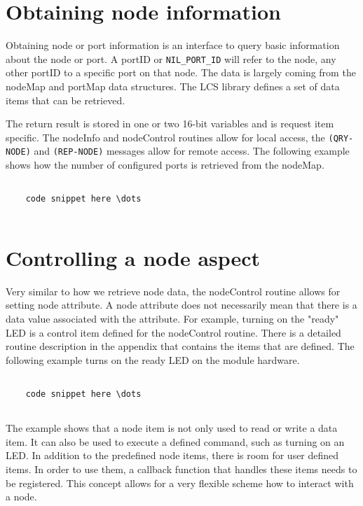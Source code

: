 \section{Obtaining node information}

Obtaining node or port information is an interface to query basic information about the node or port. A portID or \texttt{NIL\_PORT\_ID} will refer to the node, any other portID to a specific port on that node. The data is largely coming from the nodeMap and portMap data structures. The LCS library defines a set of data items that can be retrieved. 

The return result is stored in one or two 16-bit variables and is request item specific. The nodeInfo and nodeControl routines allow for local access, the \texttt{(QRY-NODE)} and \texttt{(REP-NODE)} messages allow for remote access. The following example shows how the number of configured ports is retrieved from the nodeMap.


\lstset{language=c++, style=codesnippetstyle}
\begin{lstlisting}
   
    code snippet here \dots
    
\end{lstlisting}

\section{Controlling a node aspect}

Very similar to how we retrieve node data, the nodeControl routine allows for setting node attribute. A node attribute does not necessarily mean that there is a data value associated with the attribute. For example, turning on the "ready" LED is a control item defined for the nodeControl routine. There is a detailed routine description in the appendix that contains the items that are defined. The following example turns on the ready LED on the module hardware.

\lstset{language=c++, style=codesnippetstyle}
\begin{lstlisting}
   
    code snippet here \dots
    
\end{lstlisting}

The example shows that a node item is not only used to read or write a data item. It can also be used to execute a defined command, such as turning on an LED. In addition to the predefined node items, there is room for user defined items. In order to use them, a callback function that handles these items needs to be registered. This concept allows for a very flexible scheme how to interact with a node.

